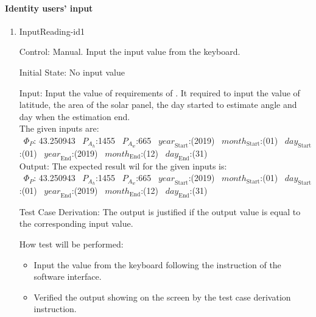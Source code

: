 \documentclass[12pt, titlepage]{article}
\begin{document}

\paragraph{Identity users' input}
\begin{enumerate}

\item{InputReading-id1\\}

Control: Manual. Input the input value from the keyboard.
					
Initial State: No input value
					
Input: Input the value of requirements of \progname. It required to input the
value of latitude, the area of the solar panel, the day started to estimate
angle and day when the estimation end.\\

 The given inputs are:\\
 ~$\Phi_P$: 43.250943 
~$P_{A_{h}}$:1455
~$P_{A_{w}}$:665
~$\mathit{year}_\text{Start}$:(2019) ~$\mathit{month}_\text{Start}$:(01) 
~$\mathit{day}_\text{Start}$:(01) ~$\mathit{year}_\text{End}$:(2019) 
~$\mathit{month}_\text{End}$:(12) 
~$\mathit{day}_\text{End}$:(31)\\

 Output: The expected result wil for the given inputs is:\\ 
~$\Phi_P$: 43.250943
~$P_{A_{h}}$:1455
~$P_{A_{w}}$:665
~$\mathit{year}_\text{Start}$:(2019) 
~$\mathit{month}_\text{Start}$:(01) 
~$\mathit{day}_\text{Start}$:(01) 
~$\mathit{year}_\text{End}$:(2019) 
~$\mathit{month}_\text{End}$:(12) 
~$\mathit{day}_\text{End}$:(31)\\


Test Case Derivation: The output is justified if the output value is equal to
the corresponding input value.

How test will be performed:
\begin{itemize}
\item Input the value from the keyboard following the instruction of the
software interface.
\item Verified the output showing on the screen by the test case derivation
instruction. 
\end{itemize}
\end{enumerate}
\end{document}
